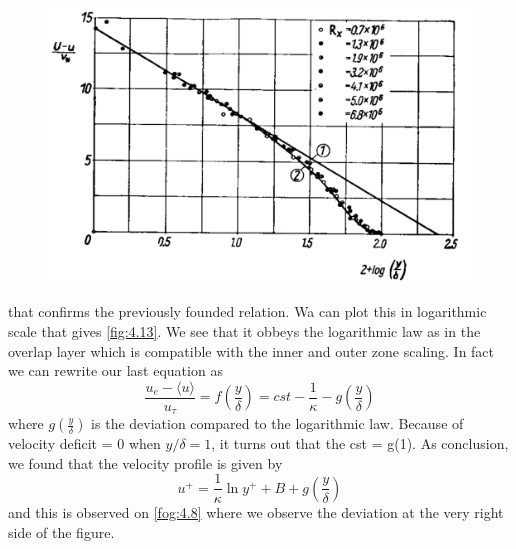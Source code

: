 		\begin{figure}
		\vspace{-5mm}
		\includegraphics[scale=0.25]{ch4/15}
		\label{fig:4.13}
		\end{figure} 
		that confirms the previously founded relation. Wa can plot this in logarithmic scale that gives \autoref{fig:4.13}. We see that it obbeys the logarithmic law as in the overlap layer which is compatible with the inner and outer zone scaling. In fact we can rewrite our last equation as 
		\begin{equation}
			 \frac{u_e - \langle u \rangle}{u_\tau} = f\left( \frac{y}{\delta}\right) = cst -\frac{1}{\kappa} - g\left(\frac{y}{\delta} \right)
		\end{equation}
		where $g\left(\frac{y}{\delta} \right)$ is the deviation compared to the logarithmic law. Because of velocity deficit = 0 when $y/\delta =1$, it turns out that the cst = g(1). As conclusion, we found that the velocity profile is given by 
		\begin{equation}
			u^+ = \frac{1}{\kappa} \ln y^+ + B + g\left(\frac{y}{\delta} \right)
		\end{equation}
 		and this is observed on \autoref{fog:4.8} where we observe the deviation at the very right side of the figure. 
 		
